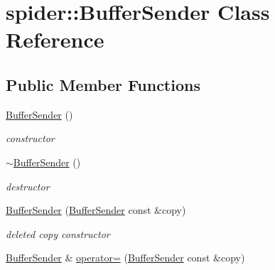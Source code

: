 \hypertarget{classspider_1_1_buffer_sender}{}\section{spider\+:\+:Buffer\+Sender Class Reference}
\label{classspider_1_1_buffer_sender}
\subsection*{Public Member Functions}
\begin{DoxyCompactItemize}
\item 
\mbox{\label{classspider_1_1_buffer_sender_ae60e0e4db97bbedad31d4eb4202ef6fd}} 
\hyperlink{classspider_1_1_buffer_sender_ae60e0e4db97bbedad31d4eb4202ef6fd}{Buffer\+Sender} ()
\begin{DoxyCompactList}\small\item\em constructor \end{DoxyCompactList}\item 
\mbox{\label{classspider_1_1_buffer_sender_ae786fd0a040282447ade97329a7734b6}} 
\hyperlink{classspider_1_1_buffer_sender_ae786fd0a040282447ade97329a7734b6}{$\sim$\+Buffer\+Sender} ()
\begin{DoxyCompactList}\small\item\em destructor \end{DoxyCompactList}\item 
\mbox{\label{classspider_1_1_buffer_sender_ac8c13c98b304c77c7af9316b7efaa40e}} 
\hyperlink{classspider_1_1_buffer_sender_ac8c13c98b304c77c7af9316b7efaa40e}{Buffer\+Sender} (\hyperlink{classspider_1_1_buffer_sender}{Buffer\+Sender} const \&copy)
\begin{DoxyCompactList}\small\item\em deleted copy constructor \end{DoxyCompactList}\item 
\mbox{\label{classspider_1_1_buffer_sender_affd59ba1df700bee8711e55a014fc56c}} 
\hyperlink{classspider_1_1_buffer_sender}{Buffer\+Sender} \& \hyperlink{classspider_1_1_buffer_sender_affd59ba1df700bee8711e55a014fc56c}{operator=} (\hyperlink{classspider_1_1_buffer_sender}{Buffer\+Sender} const \&copy)

\end{DoxyCompactItemize}
